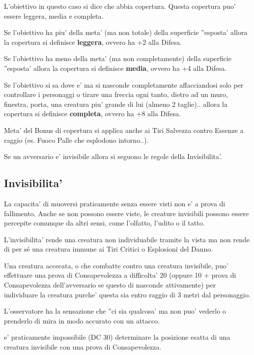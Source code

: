 \documentclass[a4paper,11pt,twoside,openany]{book}
\begin{document}
L'obiettivo in questo caso si dice che abbia copertura. Questa copertura puo' essere leggera, media e completa.

Se l'obiettivo ha piu' della meta' (ma non totale) della superficie ''esposta' allora la copertura si definisce \textbf{leggera}, ovvero ha +2 alla Difesa.

Se l'obiettivo ha meno della meta' (ma non completamente) della superficie ''esposta' allora la copertura si definisce \textbf{media}, ovvero ha +4 alla Difesa.

Se l'obiettivo si sa dove e' ma si nasconde completamente affacciandosi solo per controllare i personaggi o tirare una freccia ogni tanto, dietro ad un muro, finestra, porta, una creatura piu' grande di lui (almeno 2 taglie).. allora la copertura si definisce \textbf{completa}, ovvero ha +8 alla Difesa.

Meta' del Bonus di copertura si applica anche ai Tiri Salvezza contro
Essenze a raggio (es. Fuoco Palle che esplodono intorno..).

Se un avversario e' invisibile allora si seguono le regole della Invisibilita'.

\subsection{Invisibilita'}

\label{invisibilita}

La capacita' di muoversi praticamente senza essere visti non e' a prova di fallimento. Anche se non possono essere viste, le creature invisibili possono essere percepite comunque da altri sensi, come l'olfatto, l'udito o il tatto.

L'invisibilita' rende una creatura non individuabile tramite la vista ma non rende di per sé una creatura immune ai Tiri Critici o Esplosioni del Danno.

Una creatura accecata, o che combatte contro una creatura invisibile, puo' effettuare una prova di Consapevolezza a difficolta' 20 (oppure 10 + prova di Consapevolezza dell'avversario se questo di nasconde attivamente) per individuare la creatura purche' questa sia entro raggio di 3 metri dal personaggio.

L'osservatore ha la sensazione che ''ci sia qualcosa' ma non puo' vederlo o prenderlo di mira in modo accurato con un attacco.

e' praticamente impossibile (DC 30) determinare la posizione esatta di una creatura invisibile con una prova di Consapevolezza.
\end{document}
